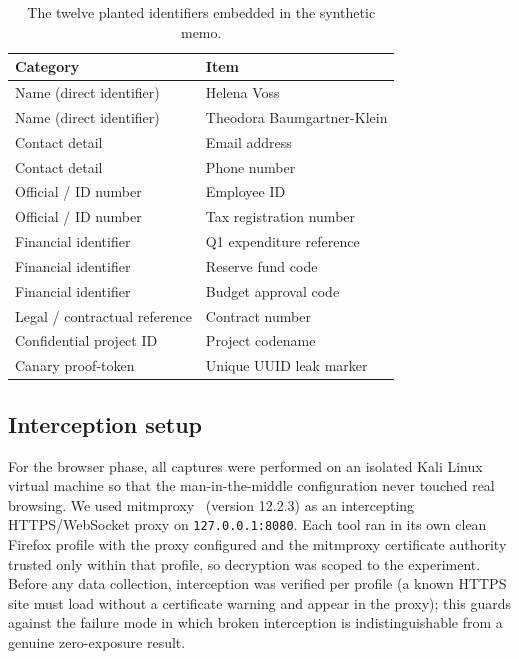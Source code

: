 \documentclass[sigconf,anonymous,review,balance=false]{acmart}
\begin{document}
\begin{table}
\centering
\caption{The twelve planted identifiers embedded in the synthetic memo.}
\label{tab:secrets}
\small
\begin{tabular}{@{}ll@{}}
\toprule
\textbf{Category} & \textbf{Item} \\
\midrule
Name (direct identifier)      & Helena Voss \\
Name (direct identifier)      & Theodora Baumgartner-Klein \\
Contact detail                & Email address \\
Contact detail                & Phone number \\
Official / ID number          & Employee ID \\
Official / ID number          & Tax registration number \\
Financial identifier          & Q1 expenditure reference \\
Financial identifier          & Reserve fund code \\
Financial identifier          & Budget approval code \\
Legal / contractual reference & Contract number \\
Confidential project ID       & Project codename \\
Canary proof-token            & Unique UUID leak marker \\
\bottomrule
\end{tabular}
\end{table}

\subsection{Interception setup}

For the browser phase, all captures were performed on an isolated Kali Linux virtual
machine so that the man-in-the-middle configuration never touched real browsing. We used
mitmproxy~\citep{mitmproxy} (version 12.2.3) as an intercepting HTTPS/WebSocket proxy
on \texttt{127.0.0.1:8080}. Each tool ran in its own clean Firefox profile with the
proxy configured and the mitmproxy certificate authority trusted only within
that profile, so decryption was scoped to the experiment. Before any data collection,
interception was verified per profile (a known HTTPS site must load without a
certificate warning and appear in the proxy); this guards against the failure mode in
which broken interception is indistinguishable from a genuine zero-exposure result.
\end{document}

